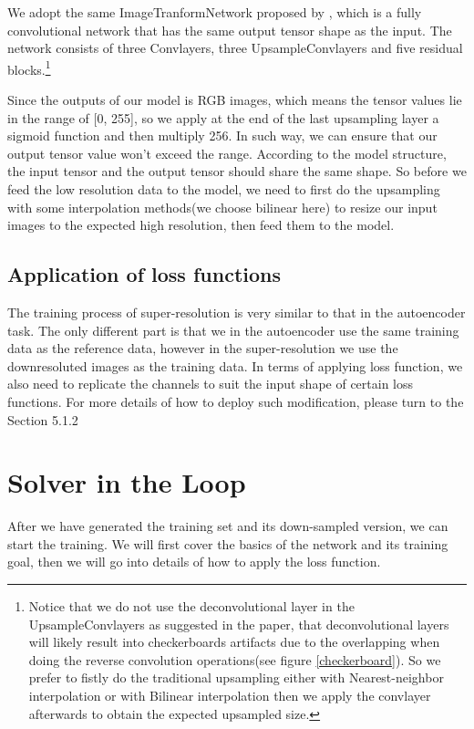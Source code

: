 \documentclass[a4paper,12pt,twoside]{report}
\begin{document}
We adopt the same ImageTranformNetwork proposed by \citeauthor{johnson2016perceptual}, which is a fully convolutional network that has the same output tensor shape as the input. The network consists of three Convlayers, three UpsampleConvlayers and five residual blocks.\footnote{Notice that we do not use the deconvolutional layer in the UpsampleConvlayers as suggested in the paper\cite{odena2016deconvolution}, that deconvolutional layers will likely result into checkerboards artifacts due to the overlapping when doing the reverse convolution operations(see figure \ref{checkerboard}). So we prefer to fistly do the traditional upsampling either with Nearest-neighbor interpolation or with Bilinear interpolation then we apply the convlayer afterwards to obtain the expected upsampled size.}

Since the outputs of our model is RGB images, which means the tensor values lie in the range of [0, 255], so we apply at the end of the last upsampling layer a sigmoid function and then multiply 256. In such way, we can ensure that our output tensor value won't exceed the range. According to the model structure, the input tensor and the output tensor should share the same shape. So before we feed the low resolution data to the model, we need to first do the upsampling with some interpolation methods(we choose bilinear here) to resize our input images to the expected high resolution, then feed them to the model. 

\subsection{Application of loss functions}
The training process of super-resolution is very similar to that in the autoencoder task. The only different part is that we in the autoencoder use the same training data as the reference data, however in the super-resolution we use the downresoluted images as the training data. In terms of applying loss function, we also need to replicate the channels to suit the input shape of certain loss functions. For more details of how to deploy such modification, please turn to the Section 5.1.2


\section{Solver in the Loop}
After we have generated the training set and its down-sampled version, we can start the training. We will first cover the basics of the network and its training goal, then we will go into details of how to apply the loss function.
\end{document}
